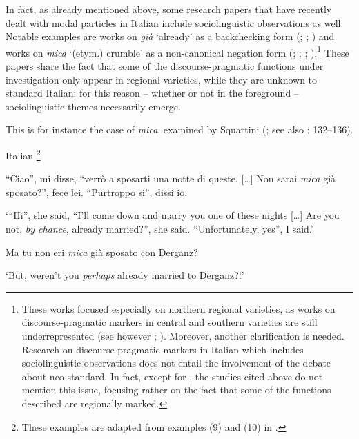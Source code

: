 In fact, as already mentioned above, some research papers that have recently dealt with modal particles in Italian include sociolinguistic observations as well. Notable examples are works on \textit{già} ‘already’ as a backchecking form (\citealt{Squartini2013,Squartini2014}; \citealt{FedrianiMiola2014}; \citealt{Calaresu2015}) and works on \textit{mica} ‘(etym.) crumble’ as a non-canonical negation form (\citealt{PescariniPenello2012}; \citealt{Squartini2017}; \citealt{Ballarè2020}; \citealt{Cerruti2020}).\footnote{These works focused especially on northern regional varieties, as works on discourse-pragmatic markers in central and southern varieties are still underrepresented (see however \citealt{Scivoletto2022}; \citealt{BrucaleEtAl2022}). Moreover, another clarification is needed. Research on discourse-pragmatic markers in Italian which includes sociolinguistic observations does not entail the involvement of the debate about neo-standard. In fact, except for \citet{Cerruti2020}, the studies cited above do not mention this issue, focusing rather on the fact that some of the functions described are regionally marked.} These papers share the fact that some of the discourse-pragmatic functions under investigation only appear in regional varieties, while they are unknown to standard Italian: for this reason – whether or not in the foreground – sociolinguistic themes necessarily emerge.

This is for instance the case of \textit{mica}, examined by Squartini (\citeyear[213–222]{Squartini2017}; see also \citealt{Cerruti2020}: 132–136).

\ea%
    \label{ex:key:11}
           Italian \citep{Squartini2017}\footnote{These examples are adapted from examples (9) and (10) in \citet[213--214]{Squartini2017}.}

\ea \label{ex:key:11a} “Ciao”, mi disse, “verrò a sposarti una notte di queste. […] Non sarai \textit{mica} già sposato?”, fece lei. “Purtroppo si”, dissi io.

\glt ‘“Hi”, she said, “I’ll come down and marry you one of these nights […] Are you not, \textit{by chance}, already married?”, she said. “Unfortunately, yes”, I said.’

\ex \label{ex:key:11b} Ma tu non eri \textit{mica} già sposato con Derganz?

\glt ‘But, weren’t you \textit{perhaps} already married to Derganz?!’
\z
\z

